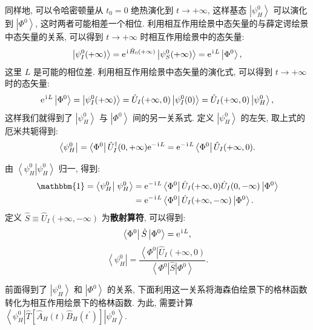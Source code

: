 同样地, 可以令哈密顿量从 $t_{0}=0$ 绝热演化到 $t \rightarrow+\infty$, 这样基态 $\left|\psi_{H}^{0}\right\rangle$ 可以演化到 $\left|\Phi^{0}\right\rangle$, 这时两者可能相差一个相位. 利用相互作用绘景中态矢量的与薛定谔绘景中态矢量的关系, 可以得到 $t \rightarrow+\infty$ 时相互作用绘景中的态矢量:
\begin{equation}
\left|\psi_{I}^{0}(+\infty)\right\rangle=\mathrm{e}^{\hspace{0.1em}\mathrm{i}\hspace{0.1em} \hat{H}_0(+\infty)}\left|\psi_{S}^{0}(+\infty)\right\rangle=\mathrm{e}^{\hspace{0.1em}\mathrm{i}\hspace{0.1em} L}\left|\Phi^{0}\right\rangle,
\end{equation}
这里 $L$ 是可能的相位差. 利用相互作用绘景中态矢量的演化式, 可以得到 $t \rightarrow+\infty$ 时的态矢量:
\begin{equation}
\mathrm{e}^{\hspace{0.1em}\mathrm{i}\hspace{0.1em} L}\left|\Phi^{0}\right\rangle=\left|\psi_{I}^{0}(+\infty)\right\rangle=\hat U_I(+\infty, 0)\left|\psi_{I}^{0}(0)\right\rangle=\hat U_I(+\infty, 0)\left|\psi_{H}^{0}\right\rangle,
\end{equation}
这样我们就得到了 $\left|\psi_{H}^{0}\right\rangle$ 与 $\left|\Phi^{0}\right\rangle$ 间的另一关系式. 定义 $\left|\psi_{H}^{0}\right\rangle$ 的左矢, 取上式的厄米共轭得到:
\begin{equation}
\left\langle\psi_{H}^{0}\right|=\left\langle\Phi^{0}\right| \hat U_I^{\dagger}(0,+\infty)\mathrm{e}^{-\hspace{0.1em}\mathrm{i}\hspace{0.1em} L}=\mathrm{e}^{-\hspace{0.1em}\mathrm{i}\hspace{0.1em} L}\left\langle\Phi^{0}\right| \hat U_I(+\infty,0).
\end{equation}

由 $\left\langle\psi_{H}^{0}\right|\left.\psi_{H}^{0}\right\rangle$ 归一, 得到:
\begin{align}
\mathbbm{1}=\left\langle\psi_{H}^{0}\right|\left.\psi_{H}^{0}\right\rangle&=\e^{-\ii L}\left\langle\Phi^{0}\right|\hat U_I(+\infty, 0) \hat U_I(0,-\infty)\left|\Phi^{0}\right\rangle\nonumber\\
&=\e^{-\ii L}\left\langle\Phi^{0}\right|\hat U_I(+\infty,-\infty)\left|\Phi^{0}\right\rangle.
\end{align}
定义 $\hat{S} \equiv \hat U_I(+\infty,-\infty)$ 为\textbf{散射算符}, 可以得到:
\begin{equation}
\left\langle\Phi^{0}\right|\hat{S}\left| \Phi^{0}\right\rangle=\mathrm{e}^{\hspace{0.1em}\mathrm{i}\hspace{0.1em} L},
\end{equation}
\begin{equation}
\left\langle\psi_{H}^{0}\right|=\frac{\left\langle\Phi^{0}\right| \hat U_I(+\infty, 0)}{\left\langle\Phi^{0}\right|\hat{S}\left| \Phi^{0}\right\rangle} .
\end{equation}

前面得到了 $\left|\psi_{H}^{0}\right\rangle$ 和 $\left|\Phi^{0}\right\rangle$ 的关系, 下面利用这一关系将海森伯绘景下的格林函数转化为相互作用绘景下的格林函数. 为此, 需要计算 $\left\langle\psi_{H}^{0}\left|\hat{T}\left[\hat{A}_{H}(t) \hat{B}_{H}\left(t^{\prime}\right)\right]\right| \psi_{H}^{0}\right\rangle$.

